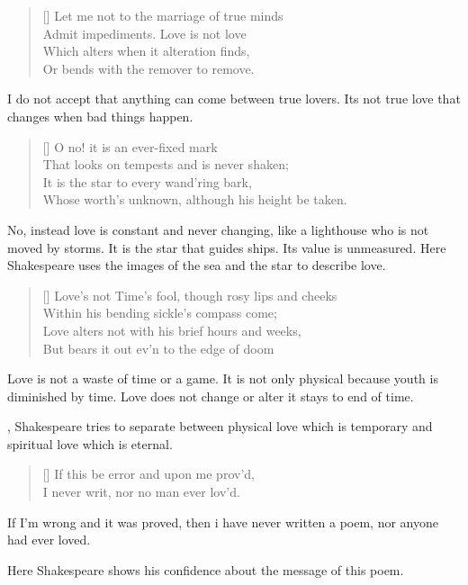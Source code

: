 \documentclass[12pt, a4paper]{article}
\begin{document}
\settowidth{\versewidth}{Let me not to the marriage of true minds}
\begin{verse}[\versewidth]
{\fontverse
Let me not to the marriage of true minds \\
Admit impediments. Love is not love \\
Which alters when it alteration finds,\\ 
Or bends with the remover to remove.
}
\end{verse}
{\fontpar
I do not accept that anything can come between 
true lovers. Its not true love that changes when bad things
happen.
}
\begin{verse}[\versewidth]
{\fontverse
O no! it is an ever-fixed mark\\
That looks on tempests and is never shaken;\\
It is the star to every wand'ring bark,\\
Whose worth's unknown, although his height be taken.
}
\end{verse}
{\fontpar
No, instead love is constant and never changing,
like a lighthouse who is not moved by storms.
It is the star that guides ships. Its value 
is unmeasured. Here Shakespeare uses the images of the sea and the star
to describe love.
}
\begin{verse}[\versewidth]
{\fontverse
Love's not Time's fool, though rosy lips and cheeks\\
Within his bending sickle's compass come; \\
Love alters not with his brief hours and weeks,\\
But bears it out ev'n to the edge of doom
}
\end{verse}
{\fontpar
Love is not a waste of time or a game. It is not only physical
because youth is diminished by time. Love does not change or alter
it stays to end of time.\medbreak

, Shakespeare tries to separate between physical
love which is temporary and spiritual love which is eternal.
}
\begin{verse}[\versewidth]
{\fontverse
If this be error and upon me prov'd,\\
I never writ, nor no man ever lov'd.
}
\end{verse}
{\fontpar
If I'm wrong and it was proved, then i have 
never written a poem, nor anyone had ever loved.\medbreak

Here Shakespeare shows his confidence about the message of this 
poem.
}
\end{document}
